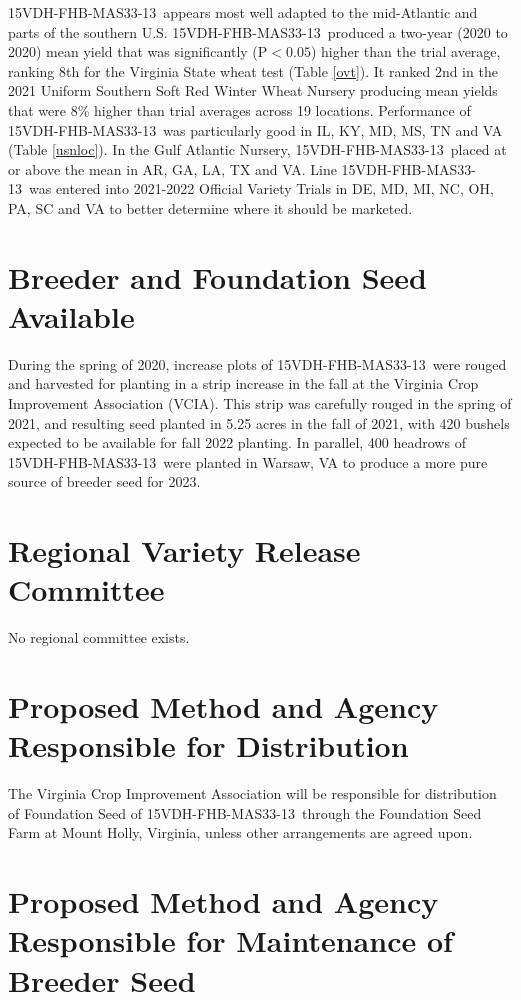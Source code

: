 \documentclass[12pt, letterpaper]{article}
\newcommand{\lin}{15VDH-FHB-MAS33-13~}
\begin{document}
\lin appears most well adapted to the mid-Atlantic and parts of the southern U.S. \lin produced a two-year (2020 to 2020) mean yield that was significantly (P$<0.05$) higher than the trial average, ranking 8th for the Virginia State wheat test (Table \ref{ovt}).  It ranked 2nd in the 2021 Uniform Southern Soft Red Winter Wheat Nursery producing mean yields that were 8\% higher than trial averages across 19 locations. Performance of \lin was particularly good in IL, KY, MD, MS, TN and VA (Table \ref{usnloc}). In the Gulf Atlantic Nursery, \lin placed at or above the mean in AR, GA, LA, TX and VA. Line \lin was entered into 2021-2022 Official Variety Trials in DE, MD, MI, NC, OH, PA, SC and VA to better determine where it should be marketed. 

\section{Breeder and Foundation Seed Available}

During the spring of 2020, increase plots of \lin were rouged and harvested for planting in a strip increase in the fall at the Virginia Crop Improvement Association (VCIA). This strip was carefully rouged in the spring of 2021, and resulting seed planted in 5.25 acres in the fall of 2021, with 420 bushels expected to be available for fall 2022 planting. In parallel, 400 headrows of \lin were planted in Warsaw, VA to produce a more pure source of breeder seed for 2023.

\section{Regional Variety Release Committee}

No regional committee exists.

\section{Proposed Method and Agency Responsible for Distribution}

The Virginia Crop Improvement Association will be responsible for distribution of Foundation Seed of \lin through the Foundation Seed Farm at Mount Holly, Virginia, unless other arrangements are agreed upon.

\section{Proposed Method and Agency Responsible for Maintenance of Breeder Seed}
\end{document}
